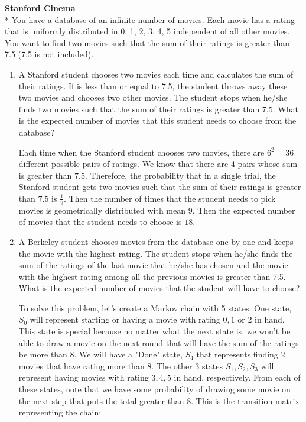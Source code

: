 \question \textbf{Stanford Cinema} \\*
You have a database of an infinite number of movies. Each movie has a 
rating that is uniformly distributed in {0, 1, 2, 3, 4, 5} independent of all other movies. You want to find two 
movies such that the sum of their ratings is greater than 7.5 (7.5 is 
not included).
\begin{enumerate}[label=\alph*)]
\item
A Stanford student chooses two movies each time and calculates the sum 
of their ratings. If is less than or equal to 7.5, the student throws 
away these two movies and chooses two other movies. The student stops 
when he/she finds two movies such that the sum of their ratings is 
greater than 7.5. What is the expected number of movies that this 
student needs to choose from the database?

\begin{solution}[4cm]
Each time when the Stanford student chooses two movies, there are $6^2 
= 36$ different possible pairs of ratings. We know that there are 4 pairs 
whose sum is greater than $7.5$. Therefore, 
the probability that in a single trial, the Stanford student gets two 
movies such that the sum of their ratings is greater than $7.5$ is 
$\frac{1}{9}$. Then the number of times that the student needs to 
pick movies is geometrically distributed with mean $9$. 
Then the expected number of movies that the student needs to choose 
is $18$.
\end{solution}

\item
A Berkeley student chooses movies from the database one by one and 
keeps the movie with the highest rating. The student stops when he/she 
finds the sum of the ratings of the last movie that he/she has chosen 
and the movie with the highest rating among all the previous movies is 
greater than 7.5. What is the expected number of movies that the 
student will have to choose?

\begin{solution}[9cm]
To solve this problem, let's create a Markov chain with 5 states. One state, $S_0$ will represent starting or having a movie with rating $0, 1$ or  $2$ in hand. This state is special because no matter what the next state is, we won't be able to draw a movie on the next round that will have the sum of the ratings be more than $8$. We will have a "Done" state, $S_4$ that represents finding 2 movies that have rating more than $8$. The other 3 states $S_1, S_2, S_3$ will represent having movies with rating $3, 4, 5$ in hand, respectively. From each of these states, note that we have some probability of drawing some movie on the next step that puts the total greater than 8. This is the transition matrix representing the chain:


\end{solution}
\end{enumerate}
